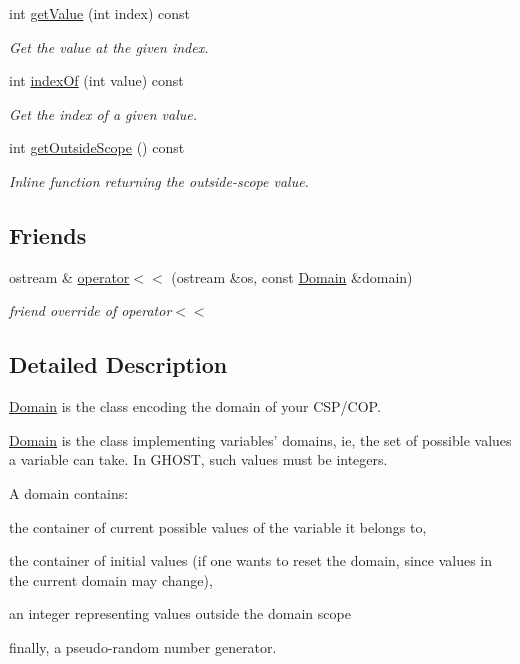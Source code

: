 \begin{DoxyCompactItemize}
int \hyperlink{classghost_1_1Domain_acf7b253ca1c490f90b8f80b5077f9b9c}{get\-Value} (int index) const 
\begin{DoxyCompactList}\small\item\em Get the value at the given index. \end{DoxyCompactList}\item 
int \hyperlink{classghost_1_1Domain_ad82154e314a7f1029e5d1512047460fd}{index\-Of} (int value) const 
\begin{DoxyCompactList}\small\item\em Get the index of a given value. \end{DoxyCompactList}\item 
int \hyperlink{classghost_1_1Domain_a08e1adce30f095a352a3c1a6937e7660}{get\-Outside\-Scope} () const 
\begin{DoxyCompactList}\small\item\em Inline function returning the outside-\/scope value. \end{DoxyCompactList}\end{DoxyCompactItemize}
\subsection*{Friends}
\begin{DoxyCompactItemize}
\item 
ostream \& \hyperlink{classghost_1_1Domain_a608c9910828eb2983efb65ff4c297a4e}{operator$<$$<$} (ostream \&os, const \hyperlink{classghost_1_1Domain}{Domain} \&domain)
\begin{DoxyCompactList}\small\item\em friend override of operator$<$$<$ \end{DoxyCompactList}\end{DoxyCompactItemize}


\subsection{Detailed Description}
\hyperlink{classghost_1_1Domain}{Domain} is the class encoding the domain of your C\-S\-P/\-C\-O\-P. 

\hyperlink{classghost_1_1Domain}{Domain} is the class implementing variables' domains, ie, the set of possible values a variable can take. In G\-H\-O\-S\-T, such values must be integers.

A domain contains\-:
\begin{DoxyEnumerate}
\item the container of current possible values of the variable it belongs to,
\item the container of initial values (if one wants to reset the domain, since values in the current domain may change),
\item an integer representing values outside the domain scope
\item finally, a pseudo-\/random number generator. 
\end{DoxyEnumerate}

